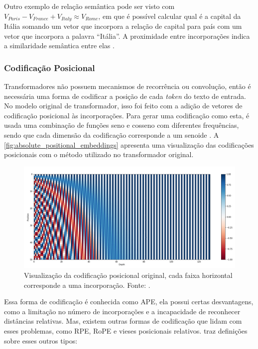Outro exemplo de relação semântica pode ser visto com \begin{math}V_{Paris} - V_{France} + V_{Italy} \approx V_{Rome}\end{math}, em que é possível calcular qual é a
capital da Itália somando um vetor que incorpora a relação de capital para país com um vetor que incorpora a palavra ``Itália''. A proximidade entre incorporações indica
a similaridade semântica entre elas \cite{word2vec_estimation}.

\subsubsection{Codificação Posicional}

Transformadores não possuem mecanismos de recorrência ou convolução, então é necessária uma forma de codificar a posição de cada \textit{token} do texto de entrada. No
modelo original de transformador, isso foi feito com a adição de vetores de codificação posicional às incorporações. Para gerar uma codificação como esta, é usada uma
combinação de funções seno e cosseno com diferentes frequências, sendo que cada dimensão da codificação corresponde a um senoide \cite{transformer}. A
\autoref{fig:absolute_positional_embeddings} apresenta uma visualização das codificações posicionais com o método utilizado no transformador original.

\begin{figure}[ht]
      \centering
      \includegraphics[width=1.0\columnwidth,keepaspectratio]{images/absolute_positional_embeddings.png}
      \caption{Visualização da codificação posicional original, cada faixa horizontal corresponde a uma incorporação. Fonte: \textcite{positional_embeddings}.}
      \label{fig:absolute_positional_embeddings}
\end{figure}

Essa forma de codificação é conhecida como \ac{APE}, ela possui certas desvantagens, como a limitação no número de incorporações e a incapacidade de reconhecer
distâncias relativas. Mas, existem outras formas de codificação que lidam com esses problemas, como \ac{RPE}, \acl{RoPE} e vieses posicionais relativos.
\textcite{llm_survey_2024} traz definições sobre esses outros tipos:

